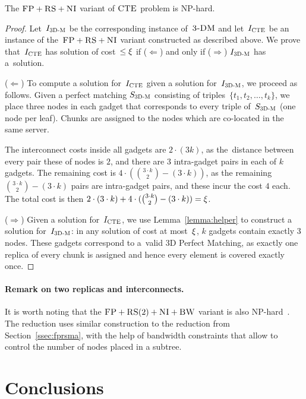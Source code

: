 \begin{theorem}
\label{theorem:fp_rs_cc}
The $\textsc{FP}+\textsc{RS}+\textsc{NI}$ variant of $\textsc{CTE}$ problem is NP-hard.
\end{theorem}
\begin{proof}
Let~$I_{\mathrm{\textsc{3D-M}}}$ be the corresponding instance of~$\textsc{3-DM}$ and let~$I_{\mathrm{\textsc{CTE}}}$ be an instance of
the~$\textsc{FP}+\textsc{RS}+\textsc{NI}$ variant constructed as described above.
We prove that~$I_{\mathrm{\textsc{CTE}}}$ has solution of cost~$\leq \xi$ if ($\Leftarrow$) and only if
($\Rightarrow$)
$I_{\mathrm{\textsc{3D-M}}}$ has a~solution.

($\Leftarrow$) To compute a solution
for~$I_{\mathrm{\textsc{CTE}}}$ given a solution for~$I_{\mathrm{\textsc{3D-M}}}$, we proceed as follows.
Given a perfect matching $S_{\mathrm{\textsc{3D-M}}}$ consisting of triples~$ \{t_1, t_2,
\ldots, t_k\}$, we place three nodes in each gadget that
corresponds to every triple of~$S_{\mathrm{\textsc{3D-M}}}$ (one node per leaf). Chunks are assigned to the nodes which are co-located
in the same server.

The interconnect costs inside all gadgets are $2\cdot (3 k)$,
as the~distance between every pair these of nodes is $2$, and there are $3$ intra-gadget pairs in each of $k$ gadgets.
The remaining cost is $4\cdot({ 3\cdot k \choose 2} - (3\cdot k))$, as the remaining ${ 3\cdot k \choose 2} - (3\cdot k)$ pairs are intra-gadget pairs, and these incur the cost $4$ each.
The total cost is then $2\cdot (3\cdot k) + 4\cdot({ 3\cdot k \choose 2} - (3\cdot k)) = \xi$.

($\Rightarrow$) Given a solution for~$I_{\mathrm{\textsc{CTE}}}$,
we use Lemma~\ref{lemma:helper} to construct a solution for~$I_{\mathrm{\textsc{3D-M}}}$: in any solution of cost at most~$\xi$,
$k$ gadgets contain exactly 3 nodes. These gadgets correspond to a~valid
3D Perfect Matching, as exactly one replica of every chunk is assigned and
hence every element is covered exactly once.
\end{proof}

\paragraph{Remark on two replicas and interconnects.}
It is worth noting that the $\textsc{FP}+\textsc{RS}(2)+\textsc{NI}+\textsc{BW}$ variant is also NP-hard~\cite{my-tcs}.
The reduction uses similar construction to the reduction from Section~\ref{ssec:fprsma},
with the help of bandwidth constraints that allow to control the number of nodes placed in a subtree.

\section{Conclusions}\label{sec:conclusion-static}



